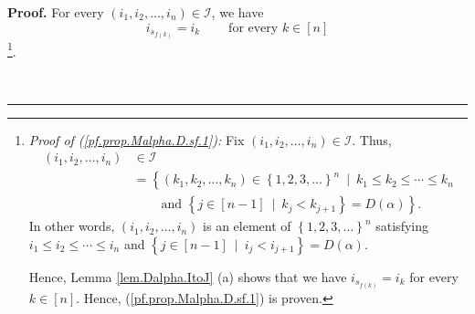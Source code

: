 \documentclass[numbers=enddot,12pt,final,onecolumn,notitlepage,abstracton]{scrartcl}
\theoremstyle{definition}
\newenvironment{proof}[1][Proof]{\noindent\textbf{#1.} }{\ \rule{0.5em}{0.5em}}
\newenvironment{verlong}{}{}
\begin{document}
\begin{verlong}
\begin{footnotesize}
\begin{proof}
For every $\left(  i_{1},i_{2},\ldots,i_{n}\right)  \in\mathcal{I}$, we have%
\begin{equation}
i_{s_{f\left(  k\right)  }}=i_{k}\ \ \ \ \ \ \ \ \ \ \text{for every }%
k\in\left[  n\right]  \label{pf.prop.Malpha.D.sf.1}%
\end{equation}
\footnote{\textit{Proof of (\ref{pf.prop.Malpha.D.sf.1}):} Fix $\left(
i_{1},i_{2},\ldots,i_{n}\right)  \in\mathcal{I}$. Thus,%
\begin{align*}
\left(  i_{1},i_{2},\ldots,i_{n}\right)   &  \in\mathcal{I}\\
&  =\left\{  \left(  k_{1},k_{2},\ldots,k_{n}\right)  \in\left\{
1,2,3,\ldots\right\}  ^{n}\ \mid\ k_{1}\leq k_{2}\leq\cdots\leq k_{n}\right.
\\
&  \ \ \ \ \ \ \ \ \ \ \left.  \text{and }\left\{  j\in\left[  n-1\right]
\ \mid\ k_{j}<k_{j+1}\right\}  =D\left(  \alpha\right)  \right\}  .
\end{align*}
In other words, $\left(  i_{1},i_{2},\ldots,i_{n}\right)  $ is an element of
$\left\{  1,2,3,\ldots\right\}  ^{n}$ satisfying $i_{1}\leq i_{2}\leq
\cdots\leq i_{n}$ and $\left\{  j\in\left[  n-1\right]  \ \mid\ i_{j}%
<i_{j+1}\right\}  =D\left(  \alpha\right)  $.
\par
Hence, Lemma \ref{lem.Dalpha.ItoJ} (a) shows that we have $i_{s_{f\left(
k\right)  }}=i_{k}$ for every $k\in\left[  n\right]  $. Hence,
(\ref{pf.prop.Malpha.D.sf.1}) is proven.}.


\end{proof}
\end{footnotesize}
\end{verlong}
\end{document}
